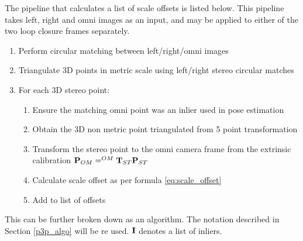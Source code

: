 The pipeline that calculates a list of scale offsets is listed below. This pipeline takes left, right and omni images as an input, and may be applied to either of the two loop closure frames separately. 

\begin{enumerate}
\itemsep0em
 \item Perform circular matching between left/right/omni images 
 \item Triangulate 3D points in metric scale using left/right stereo circular matches
 \item For each 3D stereo point:
 \begin{enumerate}
   \item Ensure the matching omni point was an inlier used in pose estimation
   \item Obtain the 3D non metric point triangulated from 5 point transformation
   \item Transform the stereo point to the omni camera frame from the extrinsic calibration $\mathbf P_{OM} =  ^{OM}\mathbf T_{ST} \mathbf P_{ST}$
   \item Calculate scale offset as per formula \ref{eq:scale_offset}
   \item Add to list of offsets 
 \end{enumerate}
\end{enumerate} 

This can be further broken down as an algorithm.  The notation described in Section \ref{p3p_algo} will be re used.  $\mathbf{I}$ denotes a list of inliers.

